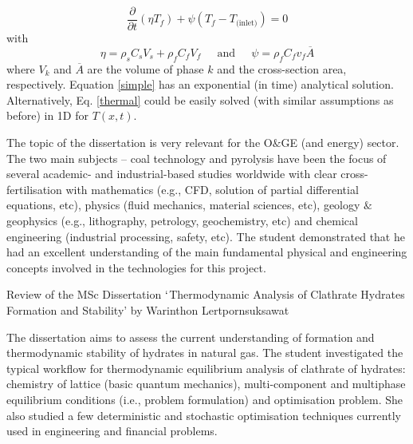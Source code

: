 \documentclass[14pt,twoside]{report}
\begin{document}
\begin{equation}
\displaystyle\frac{\partial}{\partial t}\left(\eta T_{f}\right)+ \psi\left(T_{f}-T_{\text{(inlet)}}\right) = 0\label{simple}
\end{equation} 
with
\begin{displaymath}
\eta=\rho_{s}C_{s}V_{s}+\rho_{f}C_{f}V_{f} \;\;\;\;\text{ and } \;\;\;\; \psi=\rho_{f}C_{f}v_{f}\overline{A}
\end{displaymath}
where $V_{k}$ and $\overline{A}$ are the volume of phase $k$ and the cross-section area, respectively. Equation \ref{simple} has an exponential (in time) analytical solution. Alternatively, Eq. \ref{thermal} could be easily solved (with similar assumptions as before) in 1D for $T\left(x,t\right)$.

The topic of the dissertation is very relevant for the O$\&$GE (and energy) sector. The two main subjects -- coal technology and pyrolysis have been the focus of several academic- and industrial-based studies worldwide with clear cross-fertilisation with mathematics (e.g., CFD, solution of partial differential equations, etc), physics (fluid mechanics, material sciences, etc), geology $\&$ geophysics (e.g., lithography, petrology, geochemistry, etc) and chemical engineering (industrial processing, safety, etc). The student demonstrated that he had an excellent understanding of the main fundamental physical and engineering concepts involved in the technologies for this project.    




\clearpage


\medskip

\begin{center}
{\Large Review of the MSc Dissertation $\lq$Thermodynamic Analysis of Clathrate Hydrates Formation and Stability' by Warinthon Lertpornsuksawat}
\end{center}

\medskip

The dissertation aims to assess the current understanding of formation and thermodynamic stability of hydrates in natural gas. The student investigated the typical workflow for thermodynamic equilibrium analysis of clathrate of hydrates: chemistry of lattice (basic quantum mechanics), multi-component and multiphase equilibrium conditions (i.e., problem formulation) and optimisation problem. She also studied a few deterministic and stochastic optimisation techniques currently used in engineering and financial problems.
\end{document}

